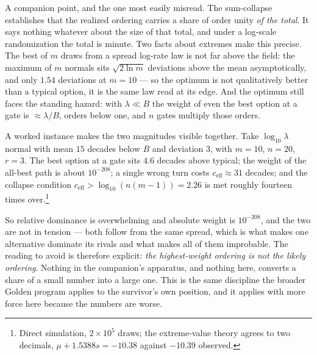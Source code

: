 \begin{remark}\label{sch:rem:absolute}
A companion point, and the one most easily misread. The sum-collapse
establishes that the realized ordering carries a share of order unity
\emph{of the total}. It says nothing whatever about the size of that
total, and under a log-scale randomization the total is minute. Two facts about extremes make this precise. The best of $m$ draws from a
spread log-rate law is not far above the field: the maximum of $m$
normals sits $\sqrt{2\ln m}$ deviations above the mean asymptotically,
and only $1.54$ deviations at $m=10$ --- so the optimum is not
qualitatively better than a typical option, it is the same law read at
its edge. And the optimum still faces the standing hazard: with
$\lambda\ll B$ the weight of even the best option at a gate is
$\approx\lambda/B$, orders below one, and $n$ gates multiply
those orders.

A worked instance makes the two magnitudes visible together. Take
$\log_{10}\lambda$ normal with mean $15$ decades below $B$ and
deviation $3$, with $m=10$, $n=20$, $r=3$. The best option at a gate
sits $4.6$ decades above typical; the weight of the all-best path is
about $10^{-208}$; a single wrong turn costs $c_{\mathrm{eff}}\approx31$
decades; and the collapse condition $c_{\mathrm{eff}}>\log_{10}(n(m-1))
=2.26$ is met roughly fourteen times over.\footnote{Direct simulation,
$2\times10^{5}$ draws; the extreme-value theory agrees to two decimals,
$\mu+1.5388s=-10.38$ against $-10.39$ observed.}

So relative dominance is overwhelming and absolute weight is
$10^{-208}$, and the two are not in tension --- both follow from the
same spread, which is what makes one alternative dominate its rivals and
what makes all of them improbable. The reading to avoid is therefore
explicit: \emph{the highest-weight ordering is not the likely ordering}.
Nothing in the companion's apparatus, and nothing here, converts a share
of a small number into a large one. This is the same discipline
the broader Golden program applies to the survivor's own position, and
it applies with more force here because the numbers are worse.
\end{remark}

